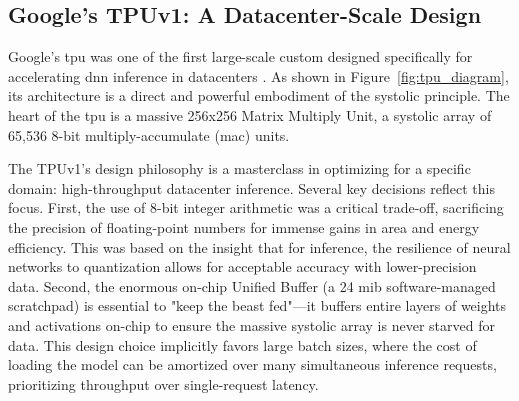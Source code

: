 \subsection{Google's TPUv1: A Datacenter-Scale Design}

Google's \acrfull{tpu} was one of the first large-scale custom  designed specifically for accelerating \acrshort{dnn} inference in datacenters \cite{jouppi2017tpu}. As shown in Figure~\ref{fig:tpu_diagram}, its architecture is a direct and powerful embodiment of the systolic principle. The heart of the \acrshort{tpu} is a massive 256x256 Matrix Multiply Unit, a systolic array of 65,536 8-bit multiply-accumulate (\acrshort{mac}) units.

The TPUv1's design philosophy is a masterclass in optimizing for a specific domain: high-throughput datacenter inference. Several key decisions reflect this focus. First, the use of 8-bit integer arithmetic was a critical trade-off, sacrificing the precision of floating-point numbers for immense gains in area and energy efficiency. This was based on the insight that for inference, the resilience of neural networks to quantization allows for acceptable accuracy with lower-precision data. Second, the enormous on-chip Unified Buffer (a 24 \acrshort{mib} software-managed scratchpad) is essential to "keep the beast fed"---it buffers entire layers of weights and activations on-chip to ensure the massive systolic array is never starved for data. This design choice implicitly favors large batch sizes, where the cost of loading the model can be amortized over many simultaneous inference requests, prioritizing throughput over single-request latency.

